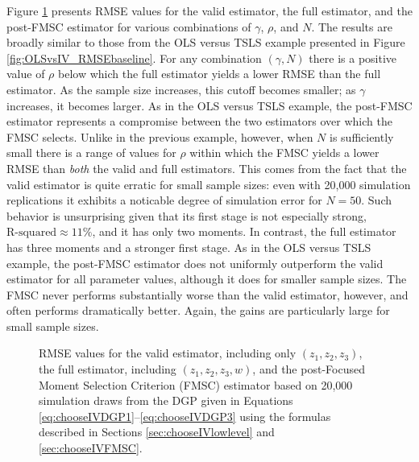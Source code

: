 Figure \ref{fig:chooseIVsim_RMSEbaseline} presents RMSE values for the valid estimator, the full estimator, and the post-FMSC estimator for various combinations of $\gamma$, $\rho$, and $N$.
The results are broadly similar to those from the OLS versus TSLS example presented in Figure \ref{fig:OLSvsIV_RMSEbaseline}.
For any combination $(\gamma,N)$ there is a positive value of $\rho$ below which the full estimator yields a lower RMSE than the full estimator.
As the sample size increases, this cutoff becomes smaller; as $\gamma$ increases, it becomes larger.
As in the OLS versus TSLS example, the post-FMSC estimator represents a compromise between the two estimators over which the FMSC selects.
Unlike in the previous example, however, when $N$ is sufficiently small there is a range of values for $\rho$ within which the FMSC yields a lower RMSE than \emph{both} the valid and full estimators.
This comes from the fact that the valid estimator is quite erratic for small sample sizes: even with 20,000 simulation replications it exhibits a noticable degree of simulation error for $N=50$.
Such behavior is unsurprising given that its first stage is not especially strong, $\mbox{R-squared}\approx 11\%$, and it has only two moments.
In contrast, the full estimator has three moments and a stronger first stage.
As in the OLS versus TSLS example, the post-FMSC estimator does not uniformly outperform the valid estimator for all parameter values, although it does for smaller sample sizes.
The FMSC never performs substantially worse than the valid estimator, however, and often performs dramatically better.
Again, the gains are particularly large for small sample sizes.
\begin{figure}
\centering
	
	\caption{RMSE values for the valid estimator, including only $(z_1, z_2, z_3)$, the full estimator, including $(z_1, z_2, z_3, w)$, and the post-Focused Moment Selection Criterion (FMSC) estimator based on 20,000 simulation draws from the DGP given in Equations \ref{eq:chooseIVDGP1}--\ref{eq:chooseIVDGP3} using the formulas described in Sections \ref{sec:chooseIVlowlevel} and \ref{sec:chooseIVFMSC}.}
	\label{fig:chooseIVsim_RMSEbaseline}
\end{figure}

